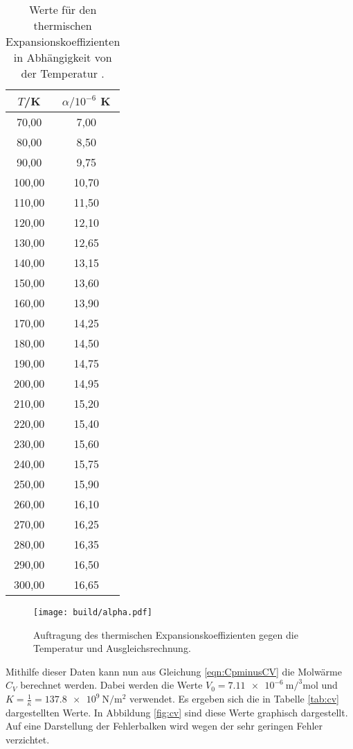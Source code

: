 \begin{table}[htp]
	\begin{center}
    \caption{Werte für den thermischen Expansionskoeffizienten \alpha in Abhängigkeit von der
    Temperatur \cite{versuchsanleitung}.}
    \label{tab:alpha}
		\begin{tabular}{cc}
		\toprule
			{$T$/K} & {$\alpha/10^{-6}$ K}\\
			\midrule
			70,00 & 7,00\\
			80,00 & 8,50\\
			90,00 & 9,75\\
			100,00 & 10,70\\
			110,00 & 11,50\\
			120,00 & 12,10\\
			130,00 & 12,65\\
			140,00 & 13,15\\
			150,00 & 13,60\\
			160,00 & 13,90\\
			170,00 & 14,25\\
			180,00 & 14,50\\
			190,00 & 14,75\\
			200,00 & 14,95\\
			210,00 & 15,20\\
			220,00 & 15,40\\
			230,00 & 15,60\\
			240,00 & 15,75\\
			250,00 & 15,90\\
			260,00 & 16,10\\
			270,00 & 16,25\\
			280,00 & 16,35\\
			290,00 & 16,50\\
			300,00 & 16,65\\
		\bottomrule
		\end{tabular}
	\end{center}
\end{table}

\begin{figure}
  \centering
  \texttt{[image: build/alpha.pdf]}
  \caption{Auftragung des thermischen Expansionskoeffizienten gegen die Temperatur und
  Ausgleichsrechnung.}
  \label{fig:alpha}
\end{figure}

Mithilfe dieser Daten kann nun aus Gleichung \eqref{eqn:CpminusCV} die Molwärme $C_V$
berechnet werden. Dabei werden die Werte $V_0=\SI{7.11e-6}{\metre\cubic\per\mol}$
\cite{molvolumen} und $K=\frac{1}{\kappa}=\SI{137.8e9}{\newton\per\metre\squared}$
\cite{kompressionsmodul} verwendet. Es ergeben sich die
in Tabelle \ref{tab:cv} dargestellten Werte. In Abbildung \ref{fig:cv} sind diese Werte
graphisch dargestellt. Auf eine Darstellung der Fehlerbalken wird wegen der sehr
geringen Fehler verzichtet.

